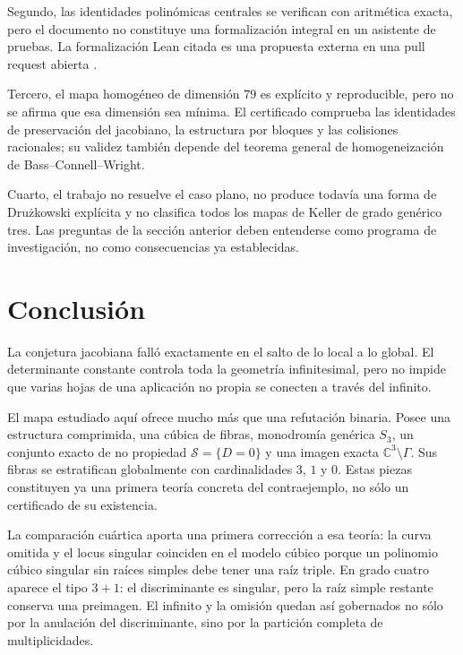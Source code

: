 \documentclass[11pt]{article}
\theoremstyle{definition}
\theoremstyle{remark}
\newcommand{\C}{\mathbb{C}}
\begin{document}
Segundo, las identidades polin\'omicas centrales se verifican con aritm\'etica
exacta, pero el documento no constituye una formalizaci\'on integral en un
asistente de pruebas. La formalizaci\'on Lean citada es una propuesta externa
en una pull request abierta \cite{LezeauLean2026}.

Tercero, el mapa homog\'eneo de dimensi\'on $79$ es expl\'icito y
reproducible, pero no se afirma que esa dimensi\'on sea m\'inima. El certificado
comprueba las identidades de preservaci\'on del jacobiano, la estructura por
bloques y las colisiones racionales; su validez tambi\'en depende del teorema
general de homogeneizaci\'on de Bass--Connell--Wright.

Cuarto, el trabajo no resuelve el caso plano, no produce todav\'ia una forma
de Dru\.zkowski expl\'icita y no clasifica todos los mapas de Keller de grado
gen\'erico tres. Las preguntas de la secci\'on anterior deben entenderse como
programa de investigaci\'on, no como consecuencias ya establecidas.

\section{Conclusi\'on}

La conjetura jacobiana fall\'o exactamente en el salto de lo local a lo global.
El determinante constante controla toda la geometr\'ia infinitesimal, pero no
impide que varias hojas de una aplicaci\'on no propia se conecten a trav\'es del
infinito.

El mapa estudiado aqu\'i ofrece mucho m\'as que una refutaci\'on binaria. Posee
una estructura comprimida, una c\'ubica de fibras, monodrom\'ia gen\'erica
$S_3$, un conjunto exacto de no propiedad
$\mathcal S=\{D=0\}$ y una imagen exacta
$\C^3\setminus\Gamma$. Sus fibras se estratifican globalmente con
cardinalidades $3$, $1$ y $0$. Estas piezas constituyen ya una primera teor\'ia
concreta del contraejemplo, no s\'olo un certificado de su existencia.

La comparaci\'on cu\'artica aporta una primera correcci\'on a esa teor\'ia: la
curva omitida y el locus singular coinciden en el modelo c\'ubico porque un
polinomio c\'ubico singular sin ra\'ices simples debe tener una ra\'iz triple.
En grado cuatro aparece el tipo $3+1$: el discriminante es singular, pero la
ra\'iz simple restante conserva una preimagen. El infinito y la omisi\'on
quedan as\'i gobernados no s\'olo por la anulaci\'on del discriminante, sino por
la partici\'on completa de multiplicidades.
\end{document}
